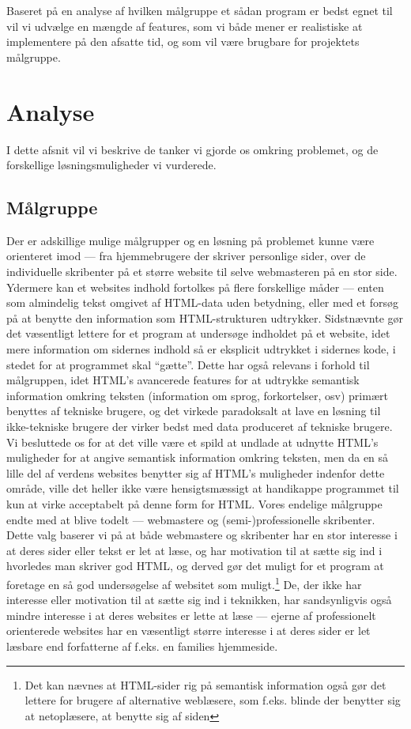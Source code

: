 \documentclass[a4paper,oneside]{memoir}
\begin{document}
Baseret på en analyse af hvilken målgruppe et sådan program er bedst
egnet til vil vi udvælge en mængde af features, som vi både mener er
realistiske at implementere på den afsatte tid, og som vil være
brugbare for projektets målgruppe.

\chapter{Analyse}
\label{analyse}
I dette afsnit vil vi beskrive de tanker vi gjorde os omkring
problemet, og de forskellige løsningsmuligheder vi vurderede.

\section{Målgruppe}
\label{målgruppe}
Der er adskillige mulige målgrupper og en løsning på problemet kunne være
orienteret imod --- fra hjemmebrugere der skriver personlige sider,
over de individuelle skribenter på et større website til selve
webmasteren på en stor side. Ydermere kan et websites indhold
fortolkes på flere forskellige måder --- enten som almindelig tekst
omgivet af HTML-data uden betydning, eller med et forsøg på at benytte
den information som HTML-strukturen udtrykker. Sidstnævnte gør det
væsentligt lettere for et program at undersøge indholdet på et
website, idet mere information om sidernes indhold så er eksplicit
udtrykket i sidernes kode, i stedet for at programmet skal
``gætte''. Dette har også relevans i forhold til målgruppen, idet
HTML's avancerede features for at udtrykke semantisk information
omkring teksten (information om sprog, forkortelser, osv) primært
benyttes af tekniske brugere, og det virkede paradoksalt at lave en
løsning til ikke-tekniske brugere der virker bedst med data produceret
af tekniske brugere. Vi besluttede os for at det ville være et spild
at undlade at udnytte HTML's muligheder for at angive semantisk
information omkring teksten, men da en så lille del af verdens
websites benytter sig af HTML's muligheder indenfor dette område,
ville det heller ikke være hensigtsmæssigt at handikappe programmet
til kun at virke acceptabelt på denne form for HTML. Vores endelige
målgruppe endte med at blive todelt --- webmastere og
(semi-)professionelle skribenter. Dette valg baserer vi på at både
webmastere og skribenter har en stor interesse i at deres sider eller
tekst er let at læse, og har motivation til at sætte sig ind i
hvorledes man skriver god HTML, og derved gør det muligt for et
program at foretage en så god undersøgelse af websitet som
muligt.\footnote{Det kan nævnes at HTML-sider rig på semantisk
  information også gør det lettere for brugere af alternative
  weblæsere, som f.eks. blinde der benytter sig at netoplæsere, at
  benytte sig af siden} De, der ikke har interesse eller motivation
til at sætte sig ind i teknikken, har sandsynligvis også mindre
interesse i at deres websites er lette at læse --- ejerne af
professionelt orienterede websites har en væsentligt større interesse
i at deres sider er let læsbare end forfatterne af f.eks. en families
hjemmeside.
\end{document}
